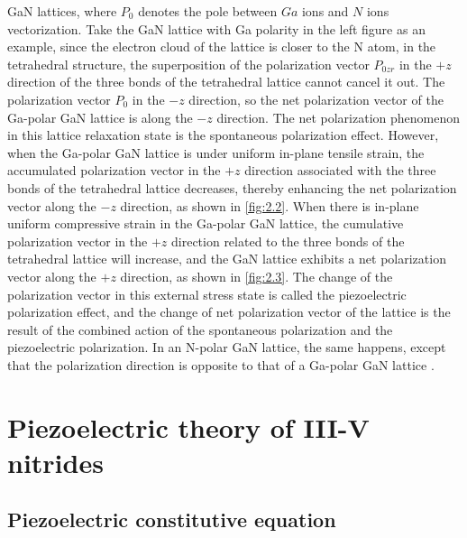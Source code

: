 \noindent GaN lattices, where $P_{0}$ denotes the pole between $Ga$ ions and $N$ ions vectorization. Take the GaN lattice with Ga polarity in the left figure as an example, since the electron cloud of the lattice is closer to the N atom, in the tetrahedral structure, the superposition of the  polarization vector $P_{0zr}$ in the $+z$ direction of the three bonds of the tetrahedral lattice cannot cancel it out. The polarization vector $P_{0}$ in the $-z$ direction, so the net polarization vector of the Ga-polar GaN lattice is along the $-z$ direction. The net polarization phenomenon in this lattice relaxation state is the spontaneous polarization  effect. However, when the Ga-polar GaN lattice is under uniform in-plane tensile strain, the accumulated polarization vector  in the $+z$ direction associated with the three bonds of the tetrahedral lattice decreases, thereby enhancing the net polarization vector along the $-z$ direction, as shown in \autoref{fig:2.2}. When there is in-plane uniform compressive strain in the Ga-polar GaN lattice, the cumulative polarization vector  in the $+z$ direction related to the three bonds of the tetrahedral lattice will increase, and the GaN lattice exhibits a net polarization vector along the $+z$ direction, as shown in \autoref{fig:2.3}. The change of the polarization vector in this external stress state is called the piezoelectric polarization  effect, and the change of net polarization vector of the lattice is the result of the combined action of the spontaneous polarization  and the piezoelectric polarization. In an N-polar GaN lattice, the same happens, except that the polarization direction is opposite to that of a Ga-polar GaN lattice \cite{morkoc2008polarization}.


\section{Piezoelectric theory of III-V nitrides}
\label{sec:Piezoelectric equations for III-V nitrides}
\subsection{Piezoelectric constitutive equation}
\label{sec:Piezoelectric constitutive equation}

